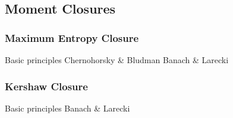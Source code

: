 \subsection{Moment Closures}

\subsubsection{Maximum Entropy Closure}
Basic principles
Chernohorsky \& Bludman
Banach \& Larecki

\subsubsection{Kershaw Closure}
Basic principles
Banach \& Larecki